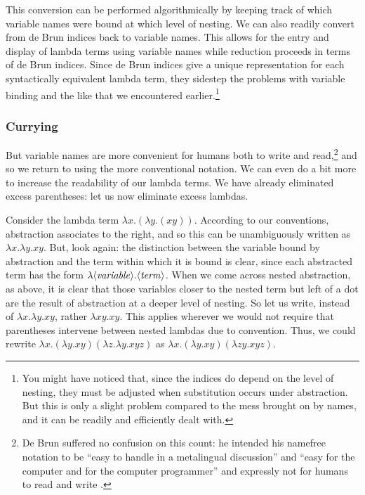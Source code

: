 This con\-ver\-sion can be performed algorithmically by keeping track of which variable names were bound at which level of nesting. We can also readily convert from de Bru\ij n indices back to variable names. This allows for the entry and display of lambda terms using variable names while reduction proceeds in terms of de Bru\ij n indices. Since de Bru\ij n indices give a unique representation for each syntactically equivalent lambda term, they sidestep the problems with variable binding and the like that we encountered earlier.\footnote{You might have noticed that, since the indices do depend on the level of nesting, they must be adjusted when substitution occurs under abstraction. But this is only a slight problem compared to the mess brought on by names, and it can be readily and efficiently dealt with.}

\subsubsection{Currying}\label{untyped:currying}
But variable names are more convenient for humans both to write and read,\footnote{De Bru\ij n suffered no confusion on this count: he intended his namefree notation to be ``easy to handle in a metalingual discussion'' and ``easy for the computer and for the computer programmer'' and expressly not for humans to read and write \citep[pp.~381--82]{Bruijn:Lambda:1972}.} and so we return to using the more conventional notation. We can even do a bit more to increase the readability of our lambda terms. We have already eliminated excess parentheses: let us now eliminate excess lambdas.

Consider the lambda term $\lambda x. (\lambda y. (xy))$. According to our conventions, abstraction associates to the right, and so this can be unambiguously written as $\lambda x. \lambda y. xy$. But, look again: the distinction between the variable bound by abstraction and the term within which it is bound is clear, since each abstracted term has the form $\lambda \text{$\langle$\textit{variable}$\rangle$} . \text{$\langle$\textit{term}$\rangle$}$. When we come across nested abstraction, as above, it is clear that those variables closer to the nested term but left of a dot are the result of abstraction at a deeper level of nesting. So let us write, instead of $\lambda x. \lambda y. xy$, rather $\lambda x y . xy$. This applies wherever we would not require that parentheses intervene between nested lambdas due to convention. Thus, we could rewrite $\lambda x. (\lambda y. xy) (\lambda z. \lambda y. xyz)$ as $\lambda x. (\lambda y. xy) (\lambda zy.xyz)$.

